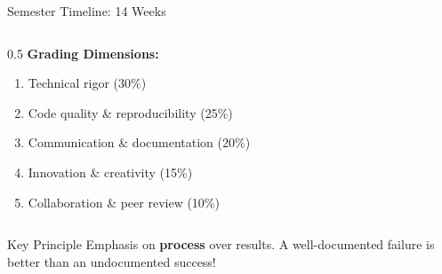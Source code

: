 \begin{frame}{Semester Timeline: 14 Weeks}
\begin{columns}
\begin{column}{0.5\textwidth}
\textbf{Grading Dimensions:}
\begin{enumerate}
\item Technical rigor (30\%)
\item Code quality \& reproducibility (25\%)
\item Communication \& documentation (20\%)
\item Innovation \& creativity (15\%)
\item Collaboration \& peer review (10\%)
\end{enumerate}
\end{column}
\end{columns}

\vspace{0.2cm}
\begin{alertblock}{Key Principle}
Emphasis on \textbf{process} over results. A well-documented failure is better than an undocumented success!
\end{alertblock}
\end{frame}


